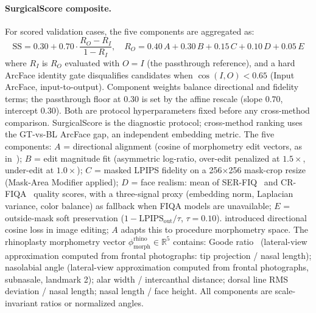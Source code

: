 \documentclass{article}
\begin{document}
\paragraph{SurgicalScore composite.}
For scored validation cases, the five components are aggregated as:
\begin{equation}
\mathrm{SS} = 0.30 + 0.70 \cdot \frac{R_O - R_I}{1 - R_I}, \quad
R_O = 0.40\,A + 0.30\,B + 0.15\,C + 0.10\,D + 0.05\,E
\label{eq:ssv5}
\end{equation}
where $R_I$ is $R_O$ evaluated with $O = I$ (the passthrough reference),
and a hard ArcFace identity gate disqualifies candidates when
$\cos(I, O) < 0.65$ (Input ArcFace, input-to-output). Component weights balance directional
and fidelity terms; the passthrough floor at $0.30$ is set by the affine rescale (slope $0.70$,
intercept $0.30$). Both are protocol hyperparameters fixed before any cross-method comparison.
SurgicalScore is the diagnostic protocol; cross-method ranking uses the GT-vs-BL ArcFace gap,
an independent embedding metric.
The five components: $A$ = directional alignment (cosine of morphometry edit vectors,
as in~\citet{gal2022stylegan_nada}); $B$ = edit magnitude fit (asymmetric log-ratio,
over-edit penalized at $1.5\times$, under-edit at $1.0\times$); $C$ = masked LPIPS
fidelity on a 256$\times$256 mask-crop resize (Mask-Area Modifier applied); $D$ =
face realism: mean of SER-FIQ~\citep{terhorst2020serfiq} and CR-FIQA~\citep{boutros2023crfiqa} quality scores, with a three-signal proxy (embedding norm, Laplacian variance, color balance) as fallback when FIQA models are unavailable; $E$ = outside-mask
soft preservation ($1 - \mathrm{LPIPS}_\text{out} / \tau$, $\tau{=}0.10$).
\citet{gal2022stylegan_nada} introduced directional cosine loss in image editing;
$A$ adapts this to procedure morphometry space.
The rhinoplasty morphometry vector $\phi_\text{morph}^\text{rhino} \in \mathbb{R}^5$ contains:
Goode ratio~\citep{goode1984rhinoplasty} (lateral-view approximation computed from frontal photographs: tip projection / nasal length);
nasolabial angle (lateral-view approximation computed from frontal photographs, subnasale, landmark 2); alar width / intercanthal distance;
dorsal line RMS deviation / nasal length; nasal length / face height.
All components are scale-invariant ratios or normalized angles.
\end{document}
